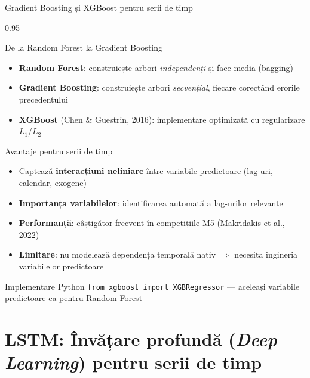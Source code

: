 \documentclass[9pt, aspectratio=169, t]{beamer}
\begin{document}
\begin{frame}{Gradient Boosting și XGBoost pentru serii de timp}
    \begin{cminipage}{0.95\textwidth}
        {\small
        \begin{block}{De la Random Forest la Gradient Boosting}
            \begin{itemize}\setlength{\itemsep}{1pt}
                \item \textbf{Random Forest}: construiește arbori \emph{independenți} și face media (bagging)
                \item \textbf{Gradient Boosting}: construiește arbori \emph{secvențial}, fiecare corectând erorile precedentului
                \item \textbf{XGBoost} (Chen \& Guestrin, 2016): implementare optimizată cu regularizare $L_1$/$L_2$
            \end{itemize}
        \end{block}
        \begin{block}{Avantaje pentru serii de timp}
            \begin{itemize}\setlength{\itemsep}{1pt}
                \item Captează \textbf{interacțiuni neliniare} între variabile predictoare (lag-uri, calendar, exogene)
                \item \textbf{Importanța variabilelor}: identificarea automată a lag-urilor relevante
                \item \textbf{Performanță}: câștigător frecvent în competițiile M5 (Makridakis et al., 2022)
                \item \textbf{Limitare}: nu modelează dependența temporală nativ $\Rightarrow$ necesită ingineria variabilelor predictoare
            \end{itemize}
        \end{block}
        \begin{exampleblock}{Implementare Python}
            \texttt{from xgboost import XGBRegressor} --- aceleași variabile predictoare ca pentru Random Forest
        \end{exampleblock}
        }
    \end{cminipage}
\end{frame}

\section{LSTM: Învățare profundă (\emph{Deep Learning}) pentru serii de timp}
\end{document}
